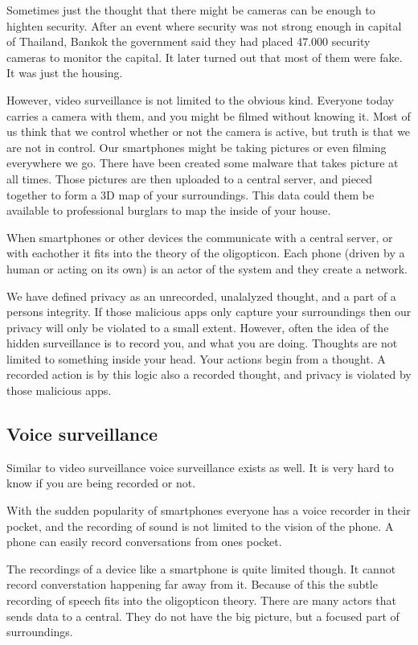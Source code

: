 Sometimes just the thought that there might be cameras can be enough to highten security. After an event where security was not strong enough in capital of Thailand, Bankok the government said they had placed 47.000 security cameras to monitor the capital. It later turned out that most of them were fake. It was just the housing.\cite{website:bangkok-security}

However, video surveillance is not limited to the obvious kind. Everyone today carries a camera with them, and you might be filmed without knowing it. Most of us think that we control whether or not the camera is active, but truth is that we are not in control. Our smartphones might be taking pictures or even filming everywhere we go. There have been created some malware that takes picture at all times. Those pictures are then uploaded to a central server, and pieced together to form a 3D map of your surroundings. This data could them be available to professional burglars to map the inside of your house.\cite{website:placeraider}

When smartphones or other devices the communicate with a central server, or with eachother it fits into the theory of the oligopticon. Each phone (driven by a human or acting on its own) is an actor of the system and they create a network.

We have defined privacy as an unrecorded, unalalyzed thought, and a part of a persons integrity. If those malicious apps only capture your surroundings then our privacy will only be violated to a small extent. However, often the idea of the hidden surveillance is to record you, and what you are doing. Thoughts are not limited to something inside your head. Your actions begin from a thought. A recorded action is by this logic also a recorded thought, and privacy is violated by those malicious apps.

\subsection{Voice surveillance}
Similar to video surveillance voice surveillance exists as well. It is very hard to know if you are being recorded or not.

With the sudden popularity of smartphones everyone has a voice recorder in their pocket, and the recording of sound is not limited to the vision of the phone. A phone can easily record conversations from ones pocket.\cite{website:carrier-iq}

The recordings of a device like a smartphone is quite limited though. It cannot record converstation happening far away from it. Because of this the subtle recording of speech fits into the oligopticon theory. There are many actors that sends data to a central. They do not have the big picture, but a focused part of surroundings.

